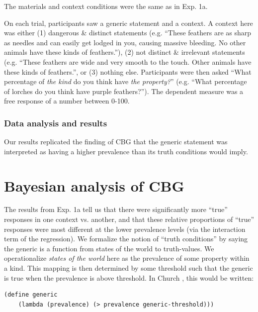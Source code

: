\documentclass[10pt,letterpaper]{article}
\begin{document}
The materials and context conditions were the same as in Exp. 1a. 

On each trial, participants saw a generic statement and a context. A context here was either (1) dangerous \& distinct statements (e.g. ``These feathers are as sharp as needles and can easily get lodged in you, causing massive bleeding. No other animals have these kinds of feathers.''), (2) not distinct \& irrelevant statements (e.g. ``These feathers are wide and very smooth to the touch. Other animals have these kinds of feathers.'', or (3) nothing else. Participants were then asked ``What percentage of \emph{the kind} do you think have \emph{the property?}'' (e.g. ``What percentage of lorches do you think have  purple feathers?''). The dependent measure was a free response of a number between 0-100. 

\subsubsection{Data analysis and results}

%

Our results replicated the finding of CBG that the generic statement was interpreted as having a higher prevalence than its truth conditions would imply. 

\section{Bayesian analysis of CBG}

The results from Exp. 1a tell us that there were significantly more ``true'' responses in one context vs. another, and that these relative proportions of ``true'' responses were most different at the lower prevalence levels (via the interaction term of the regression). We formalize the notion of ``truth conditions'' by saying the generic is a function from states of the world to truth-values. We operationalize \emph{states of the world} here as the prevalence of some property within a kind. This mapping is then determined by some threshold such that the generic is true when the prevalence is above threshold. In Church \cite{probmods}, this would be written:

\begin{lstlisting}
(define generic 
	(lambda (prevalence) (> prevalence generic-threshold)))
\end{lstlisting}
\end{document}
